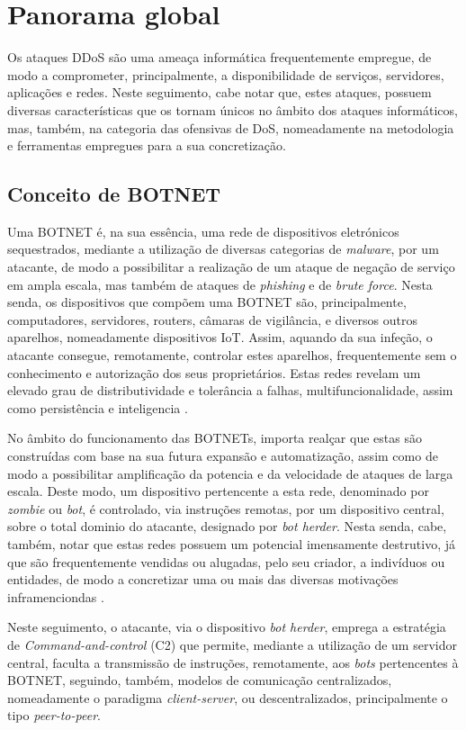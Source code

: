 \section{Panorama global}
Os ataques DDoS são uma ameaça informática frequentemente empregue, de modo a comprometer, principalmente, a disponibilidade de serviços, servidores, aplicações e redes. Neste seguimento, cabe notar que, estes ataques, possuem diversas características que os tornam únicos no âmbito dos ataques informáticos, mas, também, na categoria das ofensivas de DoS, nomeadamente na metodologia e ferramentas empregues para a sua concretização.
\subsection{Conceito de BOTNET}
Uma BOTNET é, na sua essência, uma rede de dispositivos eletrónicos sequestrados, mediante a utilização de diversas categorias de \textit{malware}, por um atacante, de modo a possibilitar a realização de um ataque de negação de serviço em ampla escala, mas também de ataques de \textit{phishing} e de \textit{brute force}. Nesta senda, os dispositivos que compõem uma BOTNET são, principalmente, computadores, servidores, routers, câmaras de vigilância, e diversos outros aparelhos, nomeadamente dispositivos IoT. Assim, aquando da sua infeção, o atacante consegue, remotamente, controlar estes aparelhos, frequentemente sem o conhecimento e autorização dos seus proprietários. Estas redes revelam um elevado grau de distributividade e tolerância a falhas, multifuncionalidade, assim como persistência e inteligencia \cite{kaspersky_botnets_2017, paloaltonetwork_botnets}.

No âmbito do funcionamento das BOTNETs, importa realçar que estas são construídas com base na sua futura expansão e automatização, assim como de modo a possibilitar amplificação da potencia e da velocidade de ataques de larga escala. Deste modo, um dispositivo pertencente a esta rede, denominado por \textit{zombie} ou \textit{bot}, é controlado, via instruções remotas, por um dispositivo central, sobre o total dominio do atacante, designado por \textit{bot herder}. Nesta senda, cabe, também, notar que estas redes possuem um potencial imensamente destrutivo, já que são frequentemente vendidas ou alugadas, pelo seu criador, a indivíduos ou entidades, de modo a concretizar uma ou mais das diversas motivações inframenciondas \cite{kaspersky_botnets_2017, paloaltonetwork_botnets}.

Neste seguimento, o atacante, via o dispositivo \textit{bot herder}, emprega a estratégia de \textit{Command-and-control} (C2) que permite, mediante a utilização de um servidor central, faculta a transmissão de instruções, remotamente, aos \textit{bots} pertencentes à BOTNET, seguindo, também, modelos de comunicação centralizados, nomeadamente o paradigma \textit{client-server}, ou descentralizados, principalmente o tipo \textit{peer-to-peer}.

